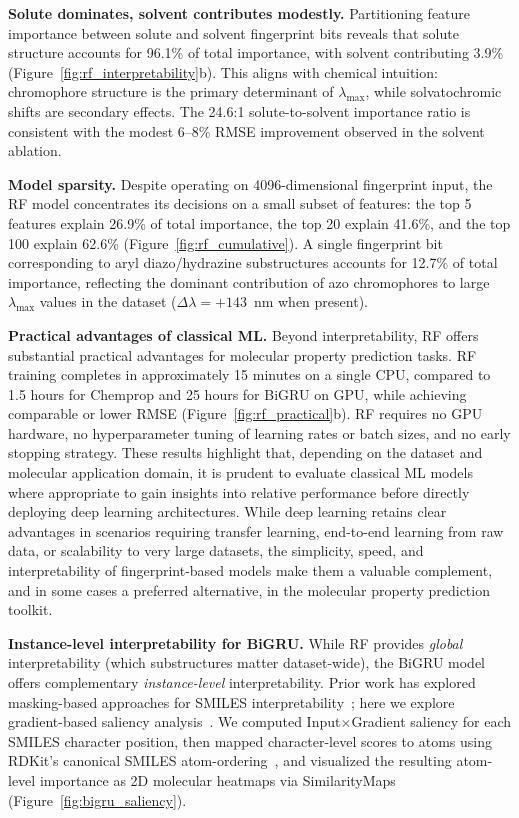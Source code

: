 \documentclass[journal=jcisd8,manuscript=article]{achemso}
\begin{document}
\textbf{Solute dominates, solvent contributes modestly.}
Partitioning feature importance between solute and solvent fingerprint bits reveals that solute structure accounts for 96.1\% of total importance, with solvent contributing 3.9\% (Figure~\ref{fig:rf_interpretability}b).
This aligns with chemical intuition: chromophore structure is the primary determinant of $\lambda_{\max}$, while solvatochromic shifts are secondary effects.
The 24.6:1 solute-to-solvent importance ratio is consistent with the modest 6--8\% RMSE improvement observed in the solvent ablation.

\textbf{Model sparsity.}
Despite operating on 4096-dimensional fingerprint input, the RF model concentrates its decisions on a small subset of features: the top 5 features explain 26.9\% of total importance, the top 20 explain 41.6\%, and the top 100 explain 62.6\% (Figure~\ref{fig:rf_cumulative}).
A single fingerprint bit corresponding to aryl diazo/hydrazine substructures accounts for 12.7\% of total importance, reflecting the dominant contribution of azo chromophores to large $\lambda_{\max}$ values in the dataset ($\Delta\lambda = +143$~nm when present).

\textbf{Practical advantages of classical ML.}
Beyond interpretability, RF offers substantial practical advantages for molecular property prediction tasks.
RF training completes in approximately 15 minutes on a single CPU, compared to 1.5 hours for Chemprop and 25 hours for BiGRU on GPU, while achieving comparable or lower RMSE (Figure~\ref{fig:rf_practical}b).
RF requires no GPU hardware, no hyperparameter tuning of learning rates or batch sizes, and no early stopping strategy.
These results highlight that, depending on the dataset and molecular application domain, it is prudent to evaluate classical ML models where appropriate to gain insights into relative performance before directly deploying deep learning architectures.
While deep learning retains clear advantages in scenarios requiring transfer learning, end-to-end learning from raw data, or scalability to very large datasets, the simplicity, speed, and interpretability of fingerprint-based models make them a valuable complement, and in some cases a preferred alternative, in the molecular property prediction toolkit.

\textbf{Instance-level interpretability for BiGRU.}
While RF provides \emph{global} interpretability (which substructures matter dataset-wide), the BiGRU model offers complementary \emph{instance-level} interpretability.
Prior work has explored masking-based approaches for SMILES interpretability~\cite{gohSMILES2VecInterpretableGeneralPurpose2018}; here we explore gradient-based saliency analysis~\cite{simonyan2014deep}.
We computed Input$\times$Gradient saliency for each SMILES character position, then mapped character-level scores to atoms using RDKit's canonical SMILES atom-ordering~\cite{landrumRdkitRdkit2020_03_12020}, and visualized the resulting atom-level importance as 2D molecular heatmaps via SimilarityMaps~\cite{riniker2013similarity} (Figure~\ref{fig:bigru_saliency}).
\end{document}
